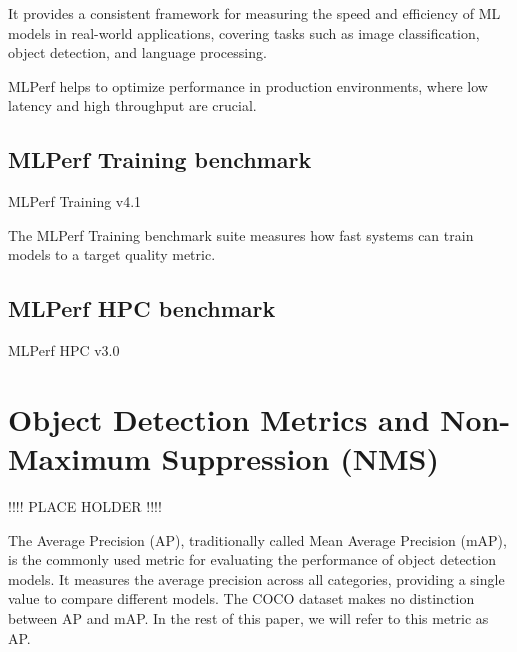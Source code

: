 \documentclass{article}
\begin{document}
It provides a consistent framework for measuring the speed and efficiency of ML models in real-world applications, covering tasks such as image classification, object detection, and language processing. 

MLPerf helps to optimize performance in production environments, where low latency and high throughput are crucial.

\subsection{MLPerf Training benchmark}

MLPerf Training v4.1 \cite{DBLP:journals/corr/abs-1910-01500}

The MLPerf Training benchmark suite measures how fast systems can train models to a target quality metric.

\subsection{MLPerf HPC benchmark}

MLPerf HPC v3.0




\section{Object Detection Metrics and Non-Maximum Suppression (NMS)}

!!!! PLACE HOLDER !!!!

The Average Precision (AP), traditionally called Mean Average Precision (mAP), is the commonly used metric for evaluating the performance of object detection models. It measures the average precision across all categories, providing a single value to compare different models. The COCO dataset makes no distinction between AP and mAP. In the rest of this paper, we will refer to this metric as AP.
\end{document}
